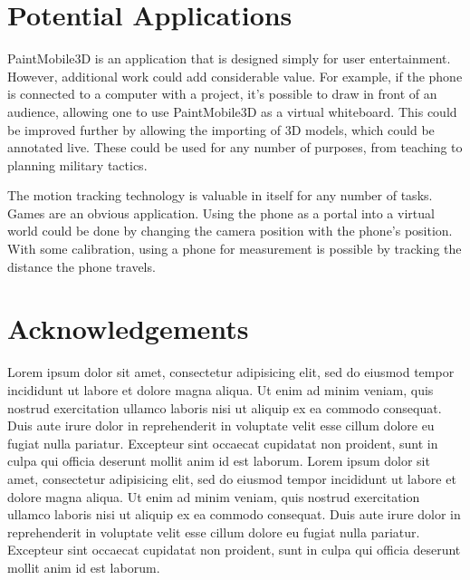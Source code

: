 \documentclass{chi-ext}
\begin{document}
\section{Potential Applications}

PaintMobile3D is an application that is designed simply for user entertainment. However, additional work could add
considerable value. For example, if the phone is connected to a computer with a project, it's possible to draw in front of an audience,
allowing one to use PaintMobile3D as a virtual whiteboard. This could be improved further by allowing the importing of
3D models, which could be annotated live. These could be used for any number of purposes, from teaching to planning military tactics.

The motion tracking technology is valuable in itself for any number of tasks. Games are an obvious application. Using the phone as a
portal into a virtual world could be done by changing the camera position with the phone's position. With some calibration, using a
phone for measurement is possible by tracking the distance the phone travels.


\section{Acknowledgements}

Lorem ipsum dolor sit amet, consectetur adipisicing elit, sed do eiusmod tempor incididunt ut labore et dolore magna aliqua. Ut enim ad minim veniam, quis nostrud exercitation ullamco laboris nisi ut aliquip ex ea commodo consequat. Duis aute irure dolor in reprehenderit in voluptate velit esse cillum dolore eu fugiat nulla pariatur. Excepteur sint occaecat cupidatat non proident, sunt in culpa qui officia deserunt mollit anim id est laborum. Lorem ipsum dolor sit amet, consectetur adipisicing elit, sed do eiusmod tempor incididunt ut labore et dolore magna aliqua. Ut enim ad minim veniam, quis nostrud exercitation ullamco laboris nisi ut aliquip ex ea commodo consequat. Duis aute irure dolor in reprehenderit in voluptate velit esse cillum dolore eu fugiat nulla pariatur. Excepteur sint occaecat cupidatat non proident, sunt in culpa qui officia deserunt mollit anim id est laborum.


\balance



\end{document}
